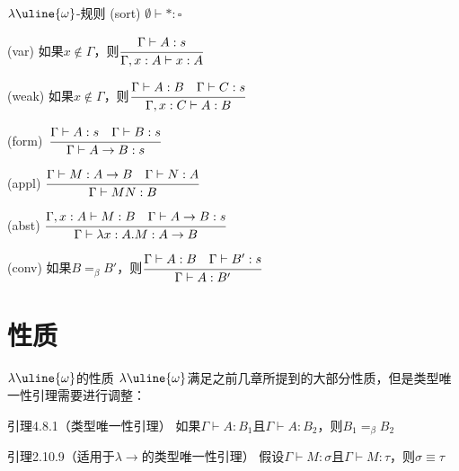 \documentclass[UTF8,aspectratio=169,mathserif]{beamer}
\begin{document}
		\begin{frame}[shrink]{$\lambda{\uline{\omega}}$-规则}
			(sort) $\emptyset \vdash *:\square$
			
			(var) 如果$x\not\in\Gamma$，则$\cfrac{\Gamma\vdash A:s}{\Gamma,x:A\vdash x:A}$
			
			(weak) 如果$x\not\in\Gamma$，则$\cfrac{\Gamma\vdash A:B\ \ \ \Gamma\vdash C:s}{\Gamma,x:C\vdash A:B}$
			
			(form)\ $\cfrac{\Gamma\vdash A:s\ \ \ \Gamma\vdash B:s}{\Gamma\vdash A\rightarrow B:s}$
			
			(appl) $\cfrac{\Gamma\vdash M:A\rightarrow B\ \ \ \Gamma\vdash N:A}{\Gamma\vdash MN:B}$
			
			(abst) $\cfrac{\Gamma,x:A\vdash M:B\ \ \ \Gamma\vdash A\rightarrow B:s}{\Gamma\vdash\lambda x:A.M:A\rightarrow B}$
			
			(conv) 如果$B=_\beta B'$，则$\cfrac{\Gamma\vdash A:B\ \ \ \Gamma\vdash B':s}{\Gamma\vdash A:B'}$\\
		\end{frame}

	\section{性质}
		\begin{frame}{$\lambda{\uline{\omega}}$的性质}
			$\lambda{\uline{\omega}}$满足之前几章所提到的大部分性质，但是类型唯一性引理需要进行调整：
			
			\begin{exampleblock}{引理4.8.1（类型唯一性引理）}
				如果$\Gamma\vdash A:B_1$且$\Gamma\vdash A:B_2$，则$B_1=_\beta B_2$
			\end{exampleblock}
		
			\begin{block}{引理2.10.9（适用于$\lambda{\rightarrow}$的类型唯一性引理）}
				假设$\Gamma\vdash M:\sigma$且$\Gamma\vdash M:\tau$，则$\sigma\equiv\tau$
			\end{block}
		\end{frame}
	
\end{document}
